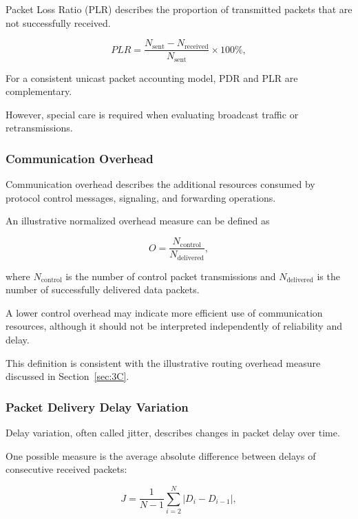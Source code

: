 Packet Loss Ratio (PLR) describes
the proportion of transmitted
packets that are not
successfully received.

\begin{equation}
PLR =
\frac{
N_{\mathrm{sent}}
-
N_{\mathrm{received}}
}{
N_{\mathrm{sent}}
}
\times 100\%,
\label{eq:plr}
\end{equation}

For a consistent unicast packet
accounting model, PDR and PLR
are complementary.

However, special care is required
when evaluating broadcast traffic
or retransmissions.

\subsubsection{Communication Overhead}

Communication overhead describes
the additional resources consumed
by protocol control messages,
signaling, and forwarding operations.

An illustrative normalized
overhead measure can be defined as

\begin{equation}
O =
\frac{
N_{\mathrm{control}}
}{
N_{\mathrm{delivered}}
},
\label{eq:control_overhead}
\end{equation}

where $N_{\mathrm{control}}$
is the number of control packet
transmissions and
$N_{\mathrm{delivered}}$
is the number of successfully
delivered data packets.

A lower control overhead may
indicate more efficient use of
communication resources, although
it should not be interpreted
independently of reliability
and delay.

This definition is consistent
with the illustrative routing
overhead measure discussed
in Section~\ref{sec:3C}.

\subsubsection{Packet Delivery Delay Variation}

Delay variation, often called
jitter, describes changes in
packet delay over time.

One possible measure is the
average absolute difference
between delays of consecutive
received packets:

\begin{equation}
J =
\frac{1}{N-1}
\sum_{i=2}^{N}
|D_i-D_{i-1}|,
\label{eq:jitter}
\end{equation}

